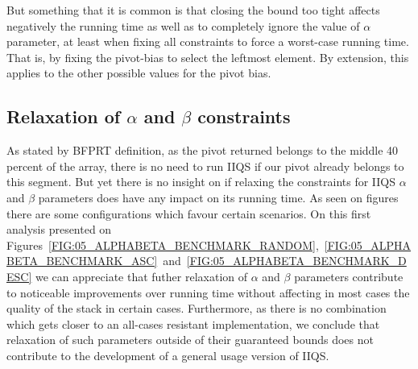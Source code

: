 But something that it is common is that closing the bound too tight affects negatively the running time as well as to completely ignore the value of $\alpha$ parameter, at least when fixing all constraints to force a worst-case running time. That is, by fixing the pivot-bias to select the leftmost element. By extension, this applies to the other possible values for the pivot bias. 


\subsection{Relaxation of $\alpha$ and $\beta$ constraints}

As stated by BFPRT definition, as the pivot returned belongs to the middle 40 percent of the array, there is no need to run IIQS if our pivot already belongs to this segment. But yet there is no insight on if relaxing the constraints for IIQS $\alpha$ and $\beta$ parameters does have any impact on its running time. As seen on figures there are some configurations which favour certain scenarios. On this first analysis presented on Figures~\ref{FIG:05_ALPHABETA_BENCHMARK_RANDOM},~\ref{FIG:05_ALPHABETA_BENCHMARK_ASC}~and~\ref{FIG:05_ALPHABETA_BENCHMARK_DESC} we can appreciate that futher relaxation of $\alpha$ and $\beta$ parameters contribute to noticeable improvements over running time without affecting in most cases the quality of the stack in certain cases. Furthermore, as there is no combination which gets closer to an all-cases resistant implementation, we conclude that relaxation of such parameters outside of their guaranteed bounds does not contribute to the development of a general usage version of IIQS.

